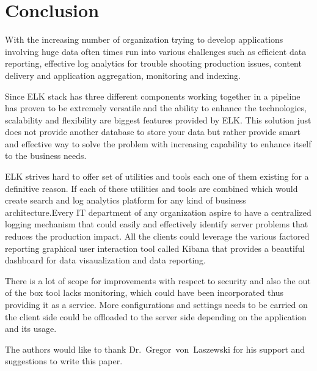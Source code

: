 \section{Conclusion}

With the increasing number of organization trying to develop applications 
involving huge data often times run into various challenges such as efficient 
data reporting, effective log analytics for trouble shooting production issues, 
content delivery and application aggregation, monitoring and indexing.

Since ELK stack has three different components working together in a pipeline 
has proven to be extremely versatile and the ability to enhance the 
technologies, scalability and flexibility are biggest features provided by ELK. 
This solution just does not provide another database to store your data but 
rather provide smart and effective way to solve the problem with increasing 
capability to enhance itself to the business needs.

ELK strives hard to offer set of utilities and tools each one of them existing 
for a definitive reason. If each of these utilities and tools are combined which
would create search and log analytics platform for any kind of business 
architecture.Every IT department of any organization aspire to have a 
centralized logging mechanism that could easily and effectively identify server
problems that reduces the production impact. All the clients could leverage the
various factored reporting graphical user interaction tool called Kibana that 
provides a beautiful dashboard for data visaualization and data reporting.

There is a lot of scope for improvements with respect to security and also the 
out of the box tool lacks monitoring, which could have been incorporated thus 
providing it as a service. More configurations and settings needs to be carried 
on the client side could be offloaded to the server side depending on the 
application and its usage. 



\begin{acks}

  The authors would like to thank Dr.~Gregor~von~Laszewski for his
  support and suggestions to write this paper.

\end{acks}


 

